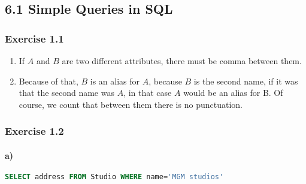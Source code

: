 \subsection*{6.1 Simple Queries in SQL}

\subsubsection*{Exercise 1.1}

\begin{enumerate}
  \item If $A$ and $B$ are two different attributes, there
        must be comma between them.
  \item Because of that, $B$ is an alias for $A$, because
        $B$ is the second name, if it was that the second
        name was $A$, in that case $A$ would be an alias
        for B. Of course, we count that between them there
        is no punctuation.
\end{enumerate}

\subsubsection*{Exercise 1.2}

\paragraph*{a)}

\begin{lstlisting}[language=sql]
SELECT address FROM Studio WHERE name='MGM studios'
\end{lstlisting}
